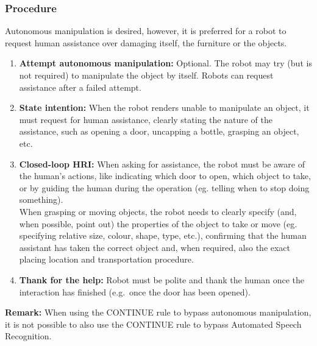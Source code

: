 \subsubsection{Procedure}
Autonomous manipulation is desired, however, it is preferred for a robot to request human assistance over damaging itself, the furniture or the objects.
\begin{enumerate}
	\item \textbf{Attempt autonomous manipulation:} Optional. The robot may try (but is not required) to manipulate the object by itself. Robots can request assistance after a failed attempt.

	\item \textbf{State intention:} When the robot renders unable to manipulate an object, it must request for human assistance, clearly stating the nature of the assistance, such as opening a door, uncapping a bottle, grasping an object, etc.

	\item \textbf{Closed-loop HRI:} When asking for assistance, the robot must be aware of the human's actions, like indicating which door to open, which object to take, or by guiding the human during the operation (eg. telling when to stop doing something).\\

	When grasping or moving objects, the robot needs to clearly specify (and, when possible, point out) the properties of the object to take or move (eg. specifying relative size, colour, shape, type, etc.), confirming that the human assistant has taken the correct object and, when required, also the exact placing location and transportation procedure.

	\item \textbf{Thank for the help:} Robot must be polite and thank the human once the interaction has finished (e.g.~once the door has been opened).
\end{enumerate}

\textbf{Remark:} When using the CONTINUE rule to bypass autonomous manipulation, it is not possible to also use the CONTINUE rule to bypass Automated Speech Recognition.

